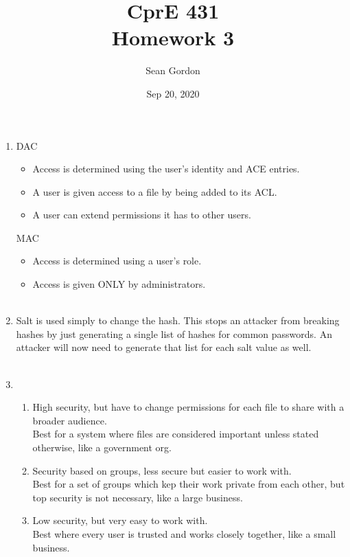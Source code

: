 \documentclass[12pt]{article}
\title{CprE 431\\Homework 3}
\author{Sean Gordon}
\date{Sep 20, 2020}
\begin{document}
\maketitle


 \begin{enumerate}
    \item DAC 
		\begin{itemize}
		\item Access is determined using the user's identity and ACE entries.
		\item A user is given access to a file by being added to its ACL.
		\item A user can extend permissions it has to other users.
		\end{itemize}
	 MAC
		\begin{itemize}
		\item Access is determined using a user's role.
		\item Access is given ONLY by administrators.\\\\
		\end{itemize}
   
    \item Salt is used simply to change the hash. This stops an attacker from breaking hashes by just generating a single list of hashes for common passwords. An attacker will now need to generate that list for each  salt value as well.\\\\
   
    \item\begin{enumerate}
   	\item High security, but have to change permissions for each file to share with a broader audience.\\
   	Best for a system where files are considered important unless stated otherwise, like a government org.
   	\item Security based on groups, less secure but easier to work with.\\
   	Best for a set of groups which kep their work private from each other, but top security is not necessary, like a large business.
   	\item Low security, but very easy to work with.\\
   	Best where every user is trusted and works closely together, like a small business.\\
   	\end{enumerate}
   	\pagebreak
   

\end{enumerate}
\end{document}
